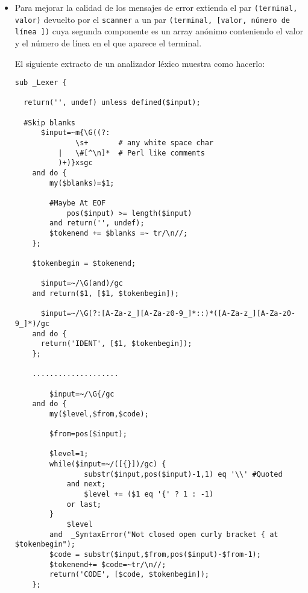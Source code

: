 \begin{itemize}
\begin{verbatim}
nereida:~/doc/casiano/PLBOOK/PLBOOK> perl -MRegexp::Common -e 'print "$RE{num}{int}\n"'
(?:(?:[+-]?)(?:[0123456789]+))
\end{verbatim}
Podemos hacer uso directo del hash \verb|%RE| directamente 
en las expresiones regulares aprovechando que estas interpolan
las variables en su interior:
 \begin{verbatim}
nereida:/tmp> cat -n prueba.pl
     1  #!/usr/bin/perl -w
     2  use strict;
     3  use Regexp::Common;
     4
     5  my $input = <>;
     6
     7  print "$&\n" if $input =~ /^$RE{num}{real}$/;
nereida:/tmp> ./prueba.pl
23.45
23.45
nereida:/tmp> ./prueba.pl
jshdf
nereida:/tmp> 
\end{verbatim}
\item
Para mejorar la calidad de los mensajes de error extienda el par \verb|(terminal, valor)|
devuelto por el \verb|scanner| a un par \verb|(terminal, [valor, número de línea ])| cuya
segunda componente es un array anónimo conteniendo 
el valor y el número de línea en el que aparece el terminal.

El siguiente extracto de un analizador léxico muestra como hacerlo:

\begin{verbatim}
sub _Lexer {

  return('', undef) unless defined($input);

  #Skip blanks
      $input=~m{\G((?:
              \s+       # any white space char
          |   \#[^\n]*  # Perl like comments
          )+)}xsgc
    and do {
        my($blanks)=$1;

        #Maybe At EOF
            pos($input) >= length($input)
        and return('', undef);
        $tokenend += $blanks =~ tr/\n//;
    };
    
    $tokenbegin = $tokenend;

      $input=~/\G(and)/gc
    and return($1, [$1, $tokenbegin]);

      $input=~/\G(?:[A-Za-z_][A-Za-z0-9_]*::)*([A-Za-z_][A-Za-z0-9_]*)/gc
    and do {
      return('IDENT', [$1, $tokenbegin]);
    };

    ....................

        $input=~/\G{/gc
    and do {
        my($level,$from,$code);

        $from=pos($input);

        $level=1;
        while($input=~/([{}])/gc) {
                substr($input,pos($input)-1,1) eq '\\' #Quoted
            and next;
                $level += ($1 eq '{' ? 1 : -1)
            or last;
        }
            $level
        and  _SyntaxError("Not closed open curly bracket { at $tokenbegin");
        $code = substr($input,$from,pos($input)-$from-1);
        $tokenend+= $code=~tr/\n//;
        return('CODE', [$code, $tokenbegin]);
    };



\end{verbatim}
\end{itemize}
